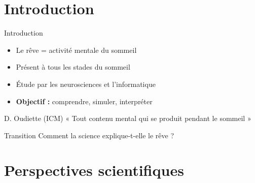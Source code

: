 \documentclass[aspectratio=169]{beamer}
\begin{document}

\section{Introduction}

\begin{frame}{Introduction}\label{introduction}

\vspace{0.12cm}
\begin{itemize}
  \item Le rêve = activité mentale du sommeil    
  \item Présent à tous les stades du sommeil
  \item Étude par les neurosciences et l'informatique
  \item \textbf{Objectif :} comprendre, simuler, interpréter
\end{itemize}

\vspace{0.32cm}

\begin{exampleblock}{D. Oudiette (ICM)}
\small « Tout contenu mental qui se produit pendant le sommeil »
\end{exampleblock}

\vspace{0.38cm}

\begin{block}{Transition}
Comment la science explique-t-elle le rêve ?
\end{block}

\end{frame}

\section{Perspectives scientifiques}\label{perspectives}
\end{document}
